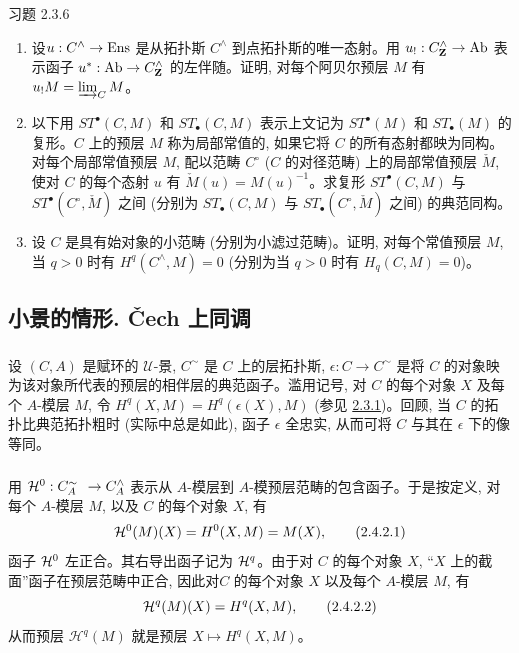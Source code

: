 \begin{enonce*}[remark]{习题 2.3.6}
\begin{enumerate}
\item 设\pageoriginale $u : C^{\wedge} \to \Ens$ 是从拓扑斯 $C^{\wedge}$ 到点拓扑斯的唯一态射。用 $u_{!} : C^{\wedge}_{\ZZ} \to \Ab$ 表示函子 $u^\ast : \Ab \to C^{\wedge}_{\ZZ}$ 的左伴随。证明, 对每个阿贝尔预层 $M$ 有 $u_{!}M =\varinjlim_{C} M$。

\item 以下用 $ST^{∙}(C, M)$ 和 $ST_{∙}(C, M)$ 表示上文记为 $ST^{∙}(M)$ 和 $ST_{∙}(M)$ 的复形。$C$ 上的预层 $M$ 称为局部常值的, 如果它将 $C$ 的所有态射都映为同构。对每个局部常值预层 $M$, 配以范畴 $C^{\circ}$ ($C$ 的对径范畴) 上的局部常值预层 $\check{M}$, 使对 $C$ 的每个态射 $u$ 有 $\check{M}(u) = M(u)^{-1}$。求复形 $ST^{∙}(C, M)$ 与 $ST^{∙}(C^{\circ}, \check{M})$ 之间 (分别为 $ST_{∙}(C, M)$ 与 $ST_{∙}(C^{\circ}, \check{M})$ 之间) 的典范同构。

\item 设 $C$ 是具有始对象的小范畴 (分别为小滤过范畴)。证明, 对每个常值预层 $M$, 当 $q > 0$ 时有 $H^{q} (C^{\wedge}, M) = 0$ (分别为当 $q > 0$ 时有 $H_q(C, M) =
  0$)。
\end{enumerate}
\end{enonce*}

\subsection{小景的情形. Čech 上同调}

\subsubsection{}
设 $(C, A)$ 是赋环的 $𝒰$-景, $C^{\sim}$ 是 $C$ 上的层拓扑斯, $\epsilon: C \to C^{\sim}$ 是将 $C$ 的对象映为该对象所代表的预层的相伴层的典范函子。滥用记号, 对 $C$ 的每个对象 $X$ 及每个 $A$-模层 $M$, 令 $H^q(X, M) = H^q(\epsilon(X), M)$ (参见 \hyperref[V.subsubsec2.3.1]{2.3.1})。回顾, 当 $C$ 的拓扑比典范拓扑粗时 (实际中总是如此), 函子 $\epsilon$ 全忠实, 从而可将 $C$ 与其在 $\epsilon$ 下的像等同。

\subsubsection{}
用 $\Hh^0 : C^{\sim{\phantom{a}}}_A \to C^{\wedge}_A$ 表示从 $A$-模层到 $A$-模预层范畴的包含函子。于是按定义, 对每个 $A$-模层 $M$, 以及 $C$ 的每个对象 $X$, 有
\begin{equation*}
{\mathcal H}^{0}(M)(X) = H^{0}(X, M) = M(X){},\tag{2.4.2.1}
\end{equation*}
函子 ${\mathcal H}^{0}$ 左正合。其右导出函子记为 ${\mathcal H}^{q}$。由于对 $C$ 的每个对象 $X$, “$X$ 上的截面”函子在预层范畴中正合, 因此对\pageoriginale $C$ 的每个对象 $X$ 以及每个 $A$-模层 $M$, 有
\begin{equation*}
\mathcal{H}^q(M)(X) = H^q(X, M){}, \tag{2.4.2.2}
\end{equation*}
从而预层 $\mathcal{H}^q(M)$ 就是预层 $X \mapsto H^q(X, M)$。

